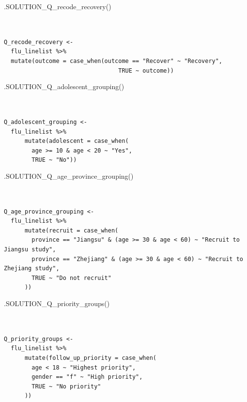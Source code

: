 \documentclass[
  letterpaper,
  DIV=11,
  numbers=noendperiod]{scrreprt}
\newenvironment{Shaded}{\begin{snugshade}}{\end{snugshade}}
\newcommand{\FunctionTok}[1]{\textcolor[rgb]{0.28,0.35,0.67}{#1}}
\newcommand{\NormalTok}[1]{\textcolor[rgb]{0.00,0.23,0.31}{#1}}
\begin{document}
\begin{Shaded}
\begin{Highlighting}[]
\FunctionTok{.SOLUTION\_Q\_recode\_recovery}\NormalTok{()}
\end{Highlighting}
\end{Shaded}

\begin{verbatim}


Q_recode_recovery <- 
  flu_linelist %>% 
  mutate(outcome = case_when(outcome == "Recover" ~ "Recovery", 
                                 TRUE ~ outcome))
\end{verbatim}

\begin{Shaded}
\begin{Highlighting}[]
\FunctionTok{.SOLUTION\_Q\_adolescent\_grouping}\NormalTok{()}
\end{Highlighting}
\end{Shaded}

\begin{verbatim}


Q_adolescent_grouping <- 
  flu_linelist %>% 
      mutate(adolescent = case_when(
        age >= 10 & age < 20 ~ "Yes",
        TRUE ~ "No"))
\end{verbatim}

\begin{Shaded}
\begin{Highlighting}[]
\FunctionTok{.SOLUTION\_Q\_age\_province\_grouping}\NormalTok{()}
\end{Highlighting}
\end{Shaded}

\begin{verbatim}


Q_age_province_grouping <- 
  flu_linelist %>% 
      mutate(recruit = case_when(
        province == "Jiangsu" & (age >= 30 & age < 60) ~ "Recruit to Jiangsu study",
        province == "Zhejiang" & (age >= 30 & age < 60) ~ "Recruit to Zhejiang study",
        TRUE ~ "Do not recruit"
      ))
\end{verbatim}

\begin{Shaded}
\begin{Highlighting}[]
\FunctionTok{.SOLUTION\_Q\_priority\_groups}\NormalTok{()}
\end{Highlighting}
\end{Shaded}

\begin{verbatim}


Q_priority_groups <- 
  flu_linelist %>% 
      mutate(follow_up_priority = case_when(
        age < 18 ~ "Highest priority", 
        gender == "f" ~ "High priority", 
        TRUE ~ "No priority"
      ))
\end{verbatim}
\end{document}
